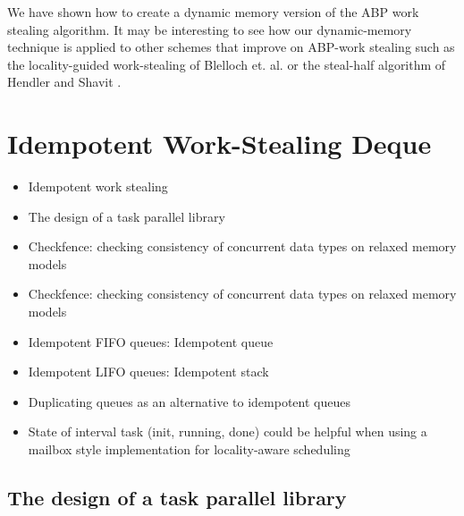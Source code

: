 We have shown how to create a dynamic memory version of the ABP work
stealing algorithm. It may be interesting to see how our
dynamic-memory technique is applied to other schemes that improve on
ABP-work stealing such as the locality-guided work-stealing of
Blelloch et. al. \cite{Acar2002} or the steal-half algorithm of
Hendler and Shavit \cite{Hendler2002}.




\section{Idempotent Work-Stealing Deque}
\label{sec:queues-implementation-idempotent-ws-deque}



\begin{itemize}
\item Idempotent work stealing \cite{Michael2009}
\item The design of a task parallel library \cite{Leijen2009}
\item Checkfence: checking consistency of concurrent data types on
  relaxed memory models \cite{Burckhardt2007}
\item Checkfence: checking consistency of concurrent data types on
  relaxed memory models \cite{Burckhardt2007a}
\end{itemize}


\begin{itemize}
\item Idempotent FIFO queues: Idempotent queue
\item Idempotent LIFO queues: Idempotent stack
\item Duplicating queues as an alternative to idempotent queues
\item State of interval task (init, running, done) could be helpful
  when using a mailbox style implementation for locality-aware
  scheduling \cite{Acar2002}
\end{itemize}

\subsection{The design of a task parallel library \cite{Leijen2009}}

